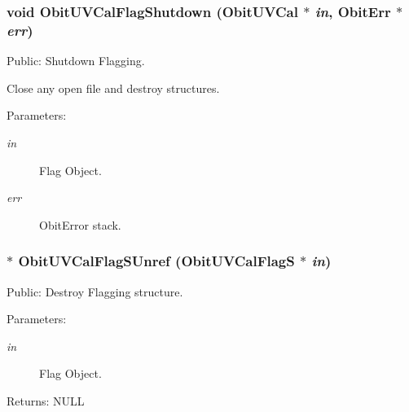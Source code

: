\subsubsection{\setlength{\rightskip}{0pt plus 5cm}void Obit\-UVCal\-Flag\-Shutdown ({\bf Obit\-UVCal} $\ast$ {\em in}, {\bf Obit\-Err} $\ast$ {\em err})}\label{ObitUVCalFlag_8c_a4}


Public: Shutdown Flagging. 

Close any open file and destroy structures. \begin{Desc}
\item[Parameters:]
\begin{description}
\item[{\em in}]Flag Object. \item[{\em err}]Obit\-Error stack. \end{description}
\end{Desc}
\subsubsection{$\ast$ Obit\-UVCal\-Flag\-SUnref ({\bf Obit\-UVCal\-Flag\-S} $\ast$ {\em in})}\label{ObitUVCalFlag_8c_a5}


Public: Destroy Flagging structure. 

\begin{Desc}
\item[Parameters:]
\begin{description}
\item[{\em in}]Flag Object. \end{description}
\end{Desc}
\begin{Desc}
\item[Returns:]NULL \end{Desc}
